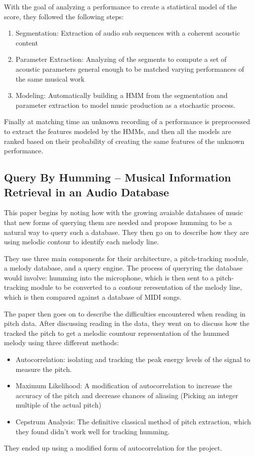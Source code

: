 \documentclass{article}
\begin{document}
	With the goal of analyzing a performance to create a statistical model of the score, they followed the following steps:
	\begin{enumerate}
		\item Segmentation: Extraction of audio sub sequences with a coherent acoustic content
		\item Parameter Extraction: Analyzing of the segments to compute a set of acoustic parameters general enough to be matched varying performances of the same musical work
		\item Modeling: Automatically building a HMM from the segmentation and parameter extraction to model music production as a stochastic process.
	\end{enumerate}
	Finally at matching time an unknown recording of a performance is preprocessed to extract the features modeled by the HMMs, and then all the models are ranked based on their probability of creating the same features of the unknown performance.
	
	\subsection{Query By Humming -- Musical Information Retrieval in an Audio Database}
	This paper begins by noting how with the growing avaiable databases of music that new forms of querying them are needed and propose humming to be a natural way to query such a database. They then go on to describe how they are using melodic contour to identify each melody line. 
	
	They use three main components for their architecture, a pitch-tracking module, a melody database, and a query engine. The process of queryring the database would involve: humming into the microphone, which is then sent to a pitch-tracking module to be converted to a contour reresentation of the melody line, which is then compared against a database of MIDI songs. 
	
	The paper then goes on to describe the difficulties encountered when reading in pitch data. After discussing reading in the data, they went on to discuss how the tracked the pitch to get a melodic countour representation of the hummed melody using three different methods: 
	\begin{itemize}
		\item Autocorrelation: isolating and tracking the peak energy levels of the signal to measure the pitch.
		\item Maximum Likelihood: A modification of autocorrelation to increase the accuracy of the pitch and decrease chances of aliasing (Picking an integer multiple of the actual pitch)
		\item Cepstrum Analysis: The definitive classical method of pitch extraction, which they found didn't work well for tracking humming.
	\end{itemize}	
	They ended up using a modified form of autocorrelation for the project.
	
\end{document}
